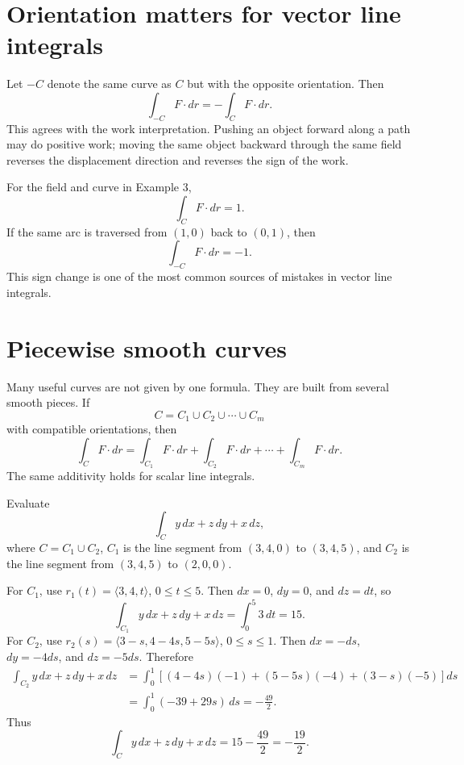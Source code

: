 \documentclass[11pt,oneside]{book}
\begin{document}
\section{Orientation matters for vector line integrals}

Let $-C$ denote the same curve as $C$ but with the opposite orientation. Then
\[
\int_{-C}F\cdot dr=-\int_C F\cdot dr.
\]
This agrees with the work interpretation. Pushing an object forward along a path may do positive work; moving the same object backward through the same field reverses the displacement direction and reverses the sign of the work.

\begin{examplebox}
For the field and curve in Example 3,
\[
\int_C F\cdot dr=1.
\]
If the same arc is traversed from $(1,0)$ back to $(0,1)$, then
\[
\int_{-C}F\cdot dr=-1.
\]
This sign change is one of the most common sources of mistakes in vector line integrals.
\end{examplebox}

\section{Piecewise smooth curves}

Many useful curves are not given by one formula. They are built from several smooth pieces. If
\[
C=C_1\cup C_2\cup\cdots\cup C_m
\]
with compatible orientations, then
\[
\int_C F\cdot dr=\int_{C_1}F\cdot dr+\int_{C_2}F\cdot dr+\cdots+\int_{C_m}F\cdot dr.
\]
The same additivity holds for scalar line integrals.

\begin{examplebox}
Evaluate
\[
\int_C y\,dx+z\,dy+x\,dz,
\]
where $C=C_1\cup C_2$, $C_1$ is the line segment from $(3,4,0)$ to $(3,4,5)$, and $C_2$ is the line segment from $(3,4,5)$ to $(2,0,0)$.

For $C_1$, use $r_1(t)=\langle 3,4,t\rangle$, $0\le t\le 5$. Then $dx=0$, $dy=0$, and $dz=dt$, so
\[
\int_{C_1} y\,dx+z\,dy+x\,dz=\int_0^5 3\,dt=15.
\]
For $C_2$, use $r_2(s)=\langle 3-s,4-4s,5-5s\rangle$, $0\le s\le 1$. Then $dx=-ds$, $dy=-4ds$, and $dz=-5ds$. Therefore
\[
\begin{aligned}
\int_{C_2} y\,dx+z\,dy+x\,dz
&=\int_0^1\left[(4-4s)(-1)+(5-5s)(-4)+(3-s)(-5)\right]ds\\
&=\int_0^1(-39+29s)\,ds=-\frac{49}{2}.
\end{aligned}
\]
Thus
\[
\int_C y\,dx+z\,dy+x\,dz=15-\frac{49}{2}=-\frac{19}{2}.
\]
\end{examplebox}
\end{document}
